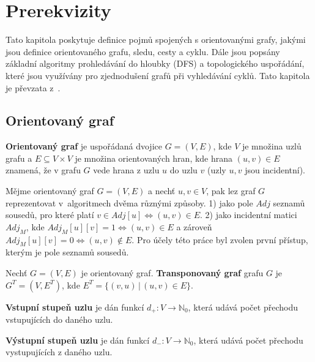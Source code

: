 \chapter{Prerekvizity}
    \label{chapter:Intro}
    Tato kapitola poskytuje definice pojmů spojených s orientovanými grafy, jakými jsou definice orientovaného grafu, sledu, cesty a cyklu. Dále jsou popsány základní algoritmy prohledávání do hloubky (DFS) a topologického uspořádání, které jsou využívány pro zjednodušení grafů při vyhledávání cyklů. Tato kapitola je převzata z~\cite{Prezentace}.

    \section{Orientovaný graf}
        \begin{definition}
            \textbf{Orientovaný graf} je uspořádaná dvojice $G = (V, E)$, kde $V$ je množina uzlů grafu a $E \subseteq V \times V$ je množina orientovaných hran, kde hrana $(u, v) \in E$ znamená, že v grafu $G$ vede hrana z uzlu $u$ do uzlu $v$ (uzly $u, v$ jsou incidentní).
        \end{definition}

        \vspace*{1em}
        Mějme orientovaný graf $G = (V, E)$ a nechť $u, v \in V$, pak lez graf $G$ reprezentovat v~algoritmech dvěma různými způsoby. 1) jako pole $Adj$ seznamů sousedů, pro které platí $v \in Adj[u] \iff (u, v) \in E$. 2) jako incidentní matici $Adj_M$, kde $Adj_M[u][v] = 1 \iff (u, v) \in E$ a zároveň  $Adj_M[u][v] = 0 \iff (u, v) \notin E$. Pro účely této práce byl zvolen první přístup, kterým je pole seznamů sousedů.

        \begin{definition}
            Nechť $G = (V, E)$ je orientovaný graf. \textbf{Transponovaný graf} grafu $G$ je $G^T = (V, E^T)$, kde $E^T = \{(v, u)\,|\, (u, v) \in E\}$.
        \end{definition}

        \begin{definition}
            \textbf{Vstupní stupeň uzlu} je dán funkcí $d_+ : V \rightarrow \mathbb{N}_0$, která udává počet přechodu vstupujících do daného uzlu.
        \end{definition}

        \begin{definition}
            \textbf{Výstupní stupeň uzlu} je dán funkcí $d_- : V \rightarrow \mathbb{N}_0$, která udává počet přechodu vystupujících z daného uzlu.
        \end{definition}

